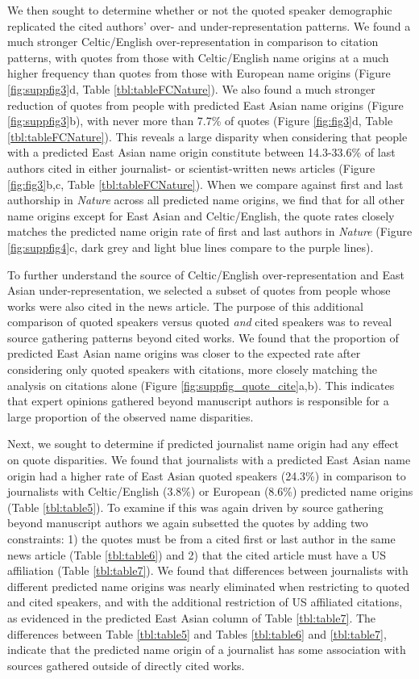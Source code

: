 We then sought to determine whether or not the quoted speaker demographic replicated the cited authors' over- and under-representation patterns.
We found a much stronger Celtic/English over-representation in comparison to citation patterns, with quotes from those with Celtic/English name origins at a much higher frequency than quotes from those with European name origins (Figure \ref{fig:suppfig3}d, Table \ref{tbl:tableFCNature}).
We also found a much stronger reduction of quotes from people with predicted East Asian name origins (Figure \ref{fig:suppfig3}b), with never more than 7.7\% of quotes (Figure \ref{fig:fig3}d, Table \ref{tbl:tableFCNature}).
This reveals a large disparity when considering that people with a predicted East Asian name origin constitute between 14.3-33.6\% of last authors cited in either journalist- or scientist-written news articles (Figure \ref{fig:fig3}b,c, Table \ref{tbl:tableFCNature}).
When we compare against first and last authorship in \emph{Nature} across all predicted name origins, we find that for all other name origins except for East Asian and Celtic/English, the quote rates closely matches the predicted name origin rate of first and last authors in \emph{Nature} (Figure \ref{fig:suppfig4}c, dark grey and light blue lines compare to the purple lines).

To further understand the source of Celtic/English over-representation and East Asian under-representation, we selected a subset of quotes from people whose works were also cited in the news article.
The purpose of this additional comparison of quoted speakers versus quoted \emph{and} cited speakers was to reveal source gathering patterns beyond cited works.
We found that the proportion of predicted East Asian name origins was closer to the expected rate after considering only quoted speakers with citations, more closely matching the analysis on citations alone (Figure \ref{fig:suppfig_quote_cite}a,b).
This indicates that expert opinions gathered beyond manuscript authors is responsible for a large proportion of the observed name disparities.

Next, we sought to determine if predicted journalist name origin had any effect on quote disparities.
We found that journalists with a predicted East Asian name origin had a higher rate of East Asian quoted speakers (24.3\%) in comparison to journalists with Celtic/English (3.8\%) or European (8.6\%) predicted name origins (Table \ref{tbl:table5}).
To examine if this was again driven by source gathering beyond manuscript authors we again subsetted the quotes by adding two constraints: 1) the quotes must be from a cited first or last author in the same news article (Table \ref{tbl:table6}) and 2) that the cited article must have a US affiliation (Table \ref{tbl:table7}).
We found that differences between journalists with different predicted name origins was nearly eliminated when restricting to quoted and cited speakers, and with the additional restriction of US affiliated citations, as evidenced in the predicted East Asian column of Table \ref{tbl:table7}.
The differences between Table \ref{tbl:table5} and Tables \ref{tbl:table6} and \ref{tbl:table7}, indicate that the predicted name origin of a journalist has some association with sources gathered outside of directly cited works.

